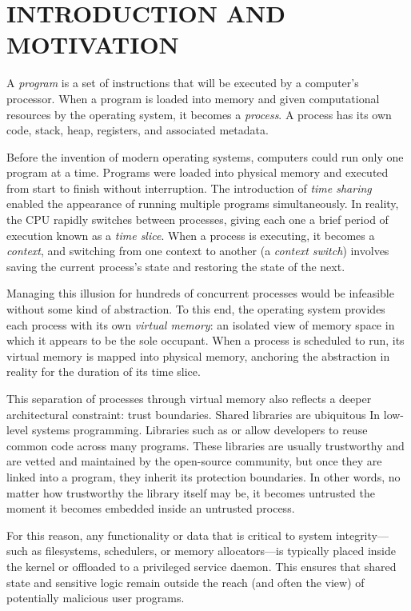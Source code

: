 \chapter*{INTRODUCTION AND MOTIVATION}
\thispagestyle{fancy}


A \textit{program} is a set of instructions that will be executed by a computer’s processor. When a program is loaded into memory and given computational resources by the operating system, it becomes a \textit{process}. A process has its own code, stack, heap, registers, and associated metadata.

Before the invention of modern operating systems, computers could run only one program at a time. Programs were loaded into physical memory and executed from start to finish without interruption. The introduction of \textit{time sharing} enabled the appearance of running multiple programs simultaneously. In reality, the CPU rapidly switches between processes, giving each one a brief period of execution known as a \textit{time slice}. When a process is executing, it becomes a \textit{context}, and switching from one context to another (a \textit{context switch}) involves saving the current process’s state and restoring the state of the next.

Managing this illusion for hundreds of concurrent processes would be infeasible without some kind of abstraction. To this end, the operating system provides each process with its own \textit{virtual memory}: an isolated view of memory space in which it appears to be the sole occupant. When a process is scheduled to run, its virtual memory is mapped into physical memory, anchoring the abstraction in reality for the duration of its time slice.

This separation of processes through virtual memory also reflects a deeper architectural constraint: trust boundaries. Shared libraries are ubiquitous In low-level systems programming. Libraries such as  or  allow developers to reuse common code across many programs. These libraries are usually trustworthy and are vetted and maintained by the open-source community, but once they are linked into a program, they inherit its protection boundaries. In other words, no matter how trustworthy the library itself may be, it becomes untrusted the moment it becomes embedded inside an untrusted process.

For this reason, any functionality or data that is critical to system integrity—such as filesystems, schedulers, or memory allocators—is typically placed inside the kernel or offloaded to a privileged service daemon. This ensures that shared state and sensitive logic remain outside the reach (and often the view) of potentially malicious user programs.

